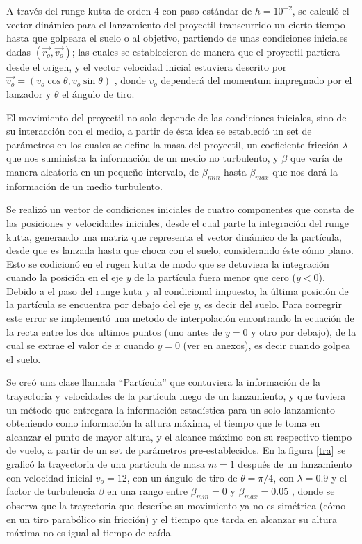 \documentclass[11pt,letterpaper,twocolumn]{article}
\begin{document}
\par 
A través del runge kutta de orden 4 con paso estándar de $h=10^{-2}$, se calculó el vector dinámico para el lanzamiento del proyectil transcurrido un cierto tiempo hasta que golpeara el suelo o al objetivo, partiendo de unas condiciones iniciales dadas $(\vec{r_{o}},\vec{v_{o}})$; las cuales se establecieron de manera que el proyectil partiera desde el origen, y el vector velocidad inicial estuviera descrito por $\overrightarrow{v_{o}}=(v_{o}\cos\theta,v_{o}\sin\theta)$ , donde $v_{o}$ dependerá del momentum impregnado por el lanzador y $\theta$ el ángulo de tiro.\\
\par 
El movimiento del proyectil no solo depende de las condiciones iniciales, sino de su interacción con el medio, a partir de ésta idea se estableció un set de parámetros en los cuales se define la masa del proyectil, un coeficiente fricción $\lambda$ que nos suministra la información de un medio no turbulento, y $\beta$ que varía de manera aleatoria en un pequeño intervalo, de $\beta_{min}$ hasta $\beta_{max}$ que nos dará la información de un medio turbulento.\\
\par 
Se realizó un vector de condiciones iniciales de cuatro componentes que consta de las posiciones y velocidades iniciales, desde el cual parte la integración del runge kutta, generando una matriz que representa el vector dinámico de la partícula, desde que es lanzada hasta que choca con el suelo, considerando éste cómo plano. Esto se codicionó en el rugen kutta de modo que se detuviera la integración cuando la posición en el eje $y$ de la partícula fuera menor que cero ($y<0$). Debido a el paso del runge kuta y al condicional impuesto, la última posición de la partícula se encuentra por debajo del eje $y$, es decir del suelo. Para corregrir este error se implementó una metodo de interpolación encontrando la ecuación de la recta entre los dos ultimos puntos (uno antes de $y=0$ y otro por debajo), de la cual se extrae el valor de $x$ cuando $y=0$ (ver en anexos), es decir cuando golpea el suelo.\\
\par
Se creó una clase llamada “Partícula” que contuviera la información de la trayectoria y velocidades de la partícula luego de un lanzamiento, y que tuviera un método que entregara la información estadística para un solo lanzamiento obteniendo como información la altura máxima, el tiempo que le toma en alcanzar el punto de mayor altura, y el alcance máximo con su respectivo tiempo de vuelo, a partir de un set de parámetros pre-establecidos. En la figura \ref{tra} se graficó la trayectoria de una partícula de masa $m=1$ después de un lanzamiento con velocidad inicial $v_{o}=12$, con un ángulo de tiro de $\theta=\pi/4$, con $\lambda=0.9$ y el factor de turbulencia $\beta$ en una rango entre $\beta_{min}=0$ y $\beta_{max}=0.05$ , donde se observa que la trayectoria que describe su movimiento ya no es simétrica (cómo en un tiro parabólico sin fricción) y el tiempo que tarda en alcanzar su altura máxima no es igual al tiempo de caída.    
\end{document}
